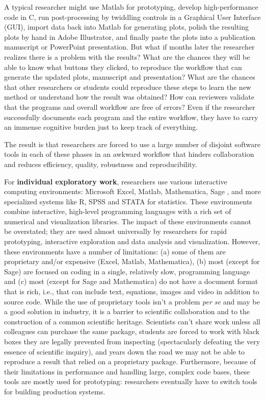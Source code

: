 \documentclass[ChapterTOCs,krantz2]{krantz} %
\begin{document}
A typical researcher might use Matlab
for prototyping, develop high-performance code in C, run post-processing
by twiddling controls in a Graphical User Interface (GUI), import
data back into Matlab for generating plots, polish the resulting plots
by hand in Adobe Illustrator, and finally paste the plots into a publication
manuscript or PowerPoint presentation. But what if months later the
researcher realizes there is a problem with the results? What are
the chances they will be able to know what buttons they clicked, to
reproduce the workflow that can generate the updated plots, manuscript
and presentation? What are the chances that other researchers or students
could reproduce these steps to learn the new method or understand
how the result was obtained? How can reviewers validate that the programs
and overall workflow are free of errors? Even if the researcher successfully
documents each program and the entire workflow, they have to carry
an immense cognitive burden just to keep track of everything.

The result is that researchers are forced to use a large
number of disjoint software tools in each of these phases in an awkward
workflow that hinders collaboration and reduces efficiency, quality,
robustness and reproducibility.

For \textbf{individual exploratory work}, researchers use various
interactive computing environments: Microsoft Excel, Matlab, Mathematica,
Sage \cite{sage}, and more specialized systems like R, SPSS and STATA
for statistics. These environments combine interactive, high-level
programming languages with a rich set of numerical and visualization
libraries. The impact of these environments cannot be overstated;
they are used almost universally by researchers for rapid prototyping,
interactive exploration and data analysis and visualization. However,
these environments have a number of limitations: (a) some of them
are proprietary and/or expensive (Excel, Matlab, Mathematica), (b)
most (except for Sage) are focused on coding in a single, relatively
slow, programming language and (c) most (except for Sage and Mathematica)
do not have a document format that is rich, i.e., that can include
text, equations, images and video in addition to source code. While
the use of proprietary tools isn't a problem \emph{per se} and may
be a good solution in industry, it is a barrier to scientific collaboration
and to the construction of a common scientific heritage. Scientists
can't share work unless all colleagues can purchase the same package,
students are forced to work with black boxes they are legally prevented
from inspecting (spectacularly defeating the very essence of scientific
inquiry), and years down the road we may not be able to reproduce
a result that relied on a proprietary package. Furthermore, because
of their limitations in performance and handling large, complex code
bases, these tools are mostly used for prototyping: researchers eventually
have to switch tools for building production systems.
\end{document}
